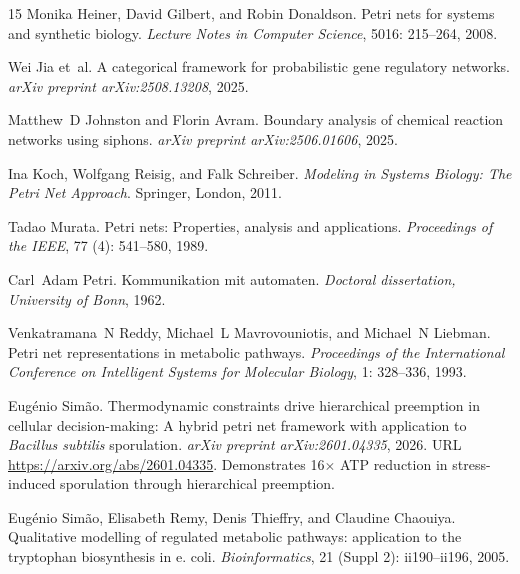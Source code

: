 \documentclass[twocolumn,11pt]{article}
\begin{document}
\begin{thebibliography}{15}
Monika Heiner, David Gilbert, and Robin Donaldson.
\newblock Petri nets for systems and synthetic biology.
\newblock \emph{Lecture Notes in Computer Science}, 5016: 215--264,
  2008.

Wei Jia et~al.
\newblock A categorical framework for probabilistic gene regulatory networks.
\newblock \emph{arXiv preprint arXiv:2508.13208}, 2025.

Matthew~D Johnston and Florin Avram.
\newblock Boundary analysis of chemical reaction networks using siphons.
\newblock \emph{arXiv preprint arXiv:2506.01606}, 2025.

Ina Koch, Wolfgang Reisig, and Falk Schreiber.
\newblock \emph{Modeling in Systems Biology: The Petri Net Approach}.
\newblock Springer, London, 2011.

Tadao Murata.
\newblock Petri nets: Properties, analysis and applications.
\newblock \emph{Proceedings of the IEEE}, 77 (4): 541--580,
  1989.

Carl~Adam Petri.
\newblock Kommunikation mit automaten.
\newblock \emph{Doctoral dissertation, University of Bonn}, 1962.

Venkatramana~N Reddy, Michael~L Mavrovouniotis, and Michael~N Liebman.
\newblock Petri net representations in metabolic pathways.
\newblock \emph{Proceedings of the International Conference on Intelligent
  Systems for Molecular Biology}, 1: 328--336, 1993.

Eug{\'e}nio Sim{\~a}o.
\newblock Thermodynamic constraints drive hierarchical preemption in cellular
  decision-making: A hybrid petri net framework with application to
  \textit{Bacillus subtilis} sporulation.
\newblock \emph{arXiv preprint arXiv:2601.04335}, 2026.
\newblock URL \url{https://arxiv.org/abs/2601.04335}.
\newblock Demonstrates 16$\times$ ATP reduction in stress-induced sporulation
  through hierarchical preemption.

Eug{\'e}nio Sim{\~a}o, Elisabeth Remy, Denis Thieffry, and Claudine Chaouiya.
\newblock Qualitative modelling of regulated metabolic pathways: application to
  the tryptophan biosynthesis in e. coli.
\newblock \emph{Bioinformatics}, 21 (Suppl 2): ii190--ii196,
  2005.

\end{thebibliography}
\end{document}
